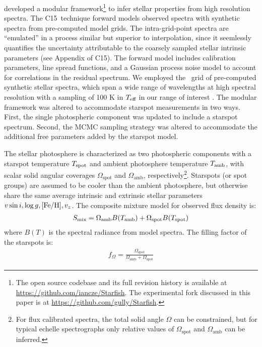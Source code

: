 \documentclass[twocolumn]{emulateapj}%
\newcommand{\iancze}{{\sc C15}}
\begin{document}
\citet[hereafter \iancze]{czekala15} developed a modular framework\footnote{The open source codebase and its full revision history is available at \url{https://github.com/iancze/Starfish}.  The experimental fork discussed in this paper is at \url{https://github.com/gully/Starfish}.  } to infer stellar properties from high resolution spectra.  The \iancze\ technique forward models observed spectra with synthetic spectra from pre-computed model grids.  The intra-grid-point spectra are ``emulated'' in a process similar but superior to interpolation, since it seemlessly quantifies the uncertainty attributable to the coarsely sampled stellar intrinsic parameters (see Appendix of \iancze).  The forward model includes calibration parameters, line spread functions, and a Gaussian process noise model to account for correlations in the residual spectrum.  We employed the \PHOENIX\ grid of pre-computed synthetic stellar spectra, which span a wide range of wavelengths at high spectral resolution with a sampling of 100 K in $T_\textrm{eff}$ in our range of interest \citep{husser13}.  The modular framework was altered to accommodate starspot measurements in two ways. First, the single photospheric component was updated to include a starspot spectrum. Second, the MCMC sampling strategy was altered to accommodate the additional free parameters added by the starspot model.

The stellar photosphere is characterized as two photospheric components with a starspot temperature $T_\textrm{spot}$ and ambient photosphere temperature $T_\textrm{amb}$, with scalar solid angular coverages $\Omega_{\mathrm{spot}}$ and $\Omega_{\mathrm{amb}}$, respectively\footnote{For flux calibrated spectra, the total solid angle $\Omega$ can be constrained, but for typical echelle spectrographs only relative values of $\Omega_{\mathrm{spot}}$ and $\Omega_{\mathrm{amb}}$ can be inferred.}.  Starspots (or spot groups) are assumed to be cooler than the ambient photosphere, but otherwise share the same average intrinsic and extrinsic stellar parameters $v \sin i, \log g, [{\rm Fe}/{\rm H}], v_z$.  The composite mixture model for observed flux density is:
\begin{eqnarray} \label{eqn:mix_M}
S_{\mathrm{mix}} = \Omega_{\mathrm{amb}} B(T_\textrm{amb})  + \Omega_{\mathrm{spot}} B(T_\textrm{spot})
\end{eqnarray}
where $B(T)$ is the spectral radiance from model spectra.  The filling factor of the starspots is:
\begin{eqnarray} \label{eqn:fill_factor}
f_{\Omega} = \frac{\Omega_{\mathrm{spot}}}{\Omega_{\mathrm{amb}} + \Omega_{\mathrm{spot}}}
\end{eqnarray}
\end{document}
